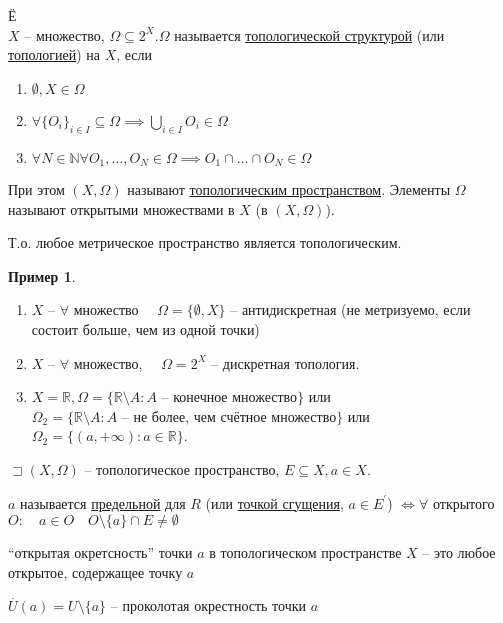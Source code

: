\documentclass{book}
\newcommand\N{\ensuremath{\mathbb{N}}}
\newcommand\R{\ensuremath{\mathbb{R}}}
\renewcommand\O{\ensuremath{\emptyset}}
\newcommand{\p}[1]{#1^{\prime}}
\theoremstyle{definition}
\newtheorem*{example}{Пример}
\begin{document}
    \begin{definition}
        Ё\\
        $X$ -- множество,  $\Omega \subseteq 2^X. 
        \Omega$ называется \underline{топологической структурой} (или \underline{топологией}) на $X$, если
            \begin{enumerate}
                \item $\O , X\in \Omega$
                \item $\forall \{O_i\}_{i\in I} \subseteq \Omega \implies  \bigcup\limits_{i \in  I} O_i \in \Omega$
                \item $\forall N\in \N \forall O_1, \ldots, O_N \in \Omega \implies  O_1\cap \ldots\cap O_N \in \Omega$
            \end{enumerate} 

    При этом $(X, \Omega)$ называют \underline{топологическим пространством}. Элементы  $\Omega$ называют открытыми множествами в  $X$ (в  $(X, \Omega)$).

    Т.о. любое метрическое пространство является топологическим.
\end{definition}

\begin{example}
   \begin{enumerate}
       \item $X$ --  $\forall $ множество $\quad \Omega = \{\O , X\}$ -- антидискретная (не метризуемо, если состоит больше, чем из одной точки)
       \item $X$ --  $\forall $ множество, $\quad \Omega = 2^X$ -- дискретная топология.
       \item $X = \R, \Omega = \{\R\setminus A: A \text{ -- конечное множество}\}$ или $\Omega_2 = \{\R\setminus A: A\text{ -- не более, чем счётное множество}\}$ или $\Omega_2 = \{(a, +\infty ):a\in \R\}$.
   \end{enumerate} 
\end{example}

\begin{definition}
    $\sqsupset (X, \Omega)$ -- топологическое пространство, $E\subseteq X, a\in X$.

    $a$ называется \underline{предельной}  для $R$ (или \underline{точкой сгущения}, $a\in \p E$) $\iff \forall $ открытого $O:\quad a\in O\quad O\setminus \{a\}\cap E\neq \O $

    ``открытая окретсность'' точки $a$ в топологическом пространстве $X$ -- это любое открытое, содержащее точку  $a$

    $\overset{\cdot } U(a) = U\setminus \{a\}$ -- проколотая окрестность точки $ a$
\end{definition}
\end{document}
